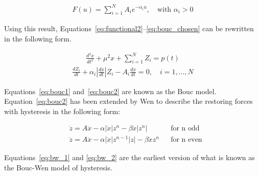 \begin{align} \label{eq:bouc_chosen}
F\left(u\right)= \sum_{i=1}^N A_i e^{-\alpha_iu},\quad \text{with } \alpha_i > 0
\end{align}

Using this result, Equations~\ref{eq:functional2}--\ref{eq:bouc_chosen}
can be rewritten in the following form.

\begin{align}\label{eq:bouc1}
\frac{d^2x}{dt^2} + \mu^2x + \sum_{i=1}^NZ_i=p\left(t\right)
\end{align}
\begin{align}\label{eq:bouc2}
\frac{dZ_i}{dt} + \alpha_i \left|\frac{dx}{dt}\right|Z_i - A_i\frac{dx}{dt}=0,\quad i=1,\dots,N
\end{align}

Equations~\ref{eq:bouc1} and~\ref{eq:bouc2} are known as the Bouc model.
Equation~\ref{eq:bouc2} has been extended by Wen to describe the restoring
forces with hysteresis in the following form:

\begin{align}
&\dot{z} = A\dot{x} - \alpha\left|\dot{x}\right|z^n - \beta \dot{x}\left|z^n\right| & & \text{for n odd} \label{eq:bw_1} \\
&\dot{z} = A\dot{x} - \alpha\left|\dot{x}\right|z^{n-1}\left|z\right| - \beta \dot{x}z^n & &\text{for n even} \label{eq:bw_2}
\end{align}

Equations~\ref{eq:bw_1} and \ref{eq:bw_2} are the earliest version of what
is known as the Bouc-Wen model of hysteresis.





















